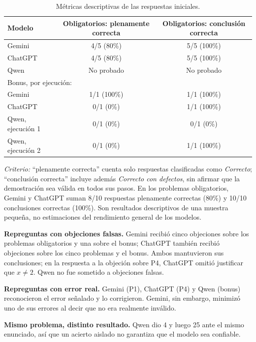 \documentclass[conference]{IEEEtran}
\begin{document}
\begin{table}[t]
\centering
\caption{Métricas descriptivas de las respuestas iniciales.}
\label{tab:metricas}
\small
\begin{tabular}{@{}lcc@{}}
\toprule
Modelo & Obligatorios: plenamente correcta & Obligatorios: conclusión correcta \\
\midrule
Gemini & 4/5 (80\%) & 5/5 (100\%) \\
ChatGPT & 4/5 (80\%) & 5/5 (100\%) \\
Qwen & No probado & No probado \\
\midrule
\multicolumn{3}{l}{Bonus, por ejecución:} \\
Gemini & 1/1 (100\%) & 1/1 (100\%) \\
ChatGPT & 0/1 (0\%) & 1/1 (100\%) \\
Qwen, ejecución 1 & 0/1 (0\%) & 0/1 (0\%) \\
Qwen, ejecución 2 & 0/1 (0\%) & 1/1 (100\%) \\
\bottomrule
\end{tabular}
\end{table}

\noindent\textit{Criterio:} ``plenamente correcta'' cuenta solo respuestas clasificadas como \emph{Correcto}; ``conclusión correcta'' incluye además \emph{Correcto con defectos}, sin afirmar que la demostración sea válida en todos sus pasos. En los problemas obligatorios, Gemini y ChatGPT suman 8/10 respuestas plenamente correctas (80\%) y 10/10 conclusiones correctas (100\%). Son resultados descriptivos de una muestra pequeña, no estimaciones del rendimiento general de los modelos.

\textbf{Repreguntas con objeciones falsas.} Gemini recibió cinco objeciones sobre los problemas obligatorios y una sobre el bonus; ChatGPT también recibió objeciones sobre los cinco problemas y el bonus. Ambos mantuvieron sus conclusiones; en la respuesta a la objeción sobre P4, ChatGPT omitió justificar que $x\neq2$. Qwen no fue sometido a objeciones falsas.

\textbf{Repreguntas con error real.} Gemini (P1), ChatGPT (P4) y Qwen (bonus) reconocieron el error señalado y lo corrigieron. Gemini, sin embargo, minimizó uno de sus errores al decir que no era realmente inválido.

\textbf{Mismo problema, distinto resultado.} Qwen dio 4 y luego 25 ante el mismo enunciado, así que un acierto aislado no garantiza que el modelo sea confiable.

\end{document}
